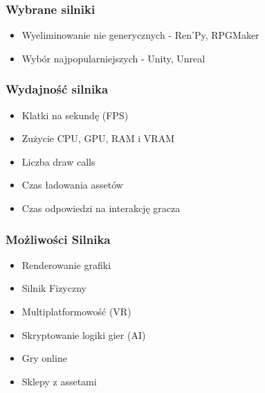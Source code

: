 \documentclass{beamer}
\begin{document}
\begin{frame}
  \frametitle{Wybrane silniki}
  \begin{itemize}
    \item Wyeliminowanie nie generycznych - Ren'Py, RPGMaker
    \item Wybór najpopularniejszych - Unity, Unreal 
  \end{itemize}
\end{frame}

\begin{frame} 
  \frametitle{Wydajność silnika}
  \begin{itemize}
    \item Klatki na sekundę (FPS)
    \item Zużycie CPU, GPU, RAM i VRAM
    \item Liczba draw calls 
    \item Czas ładowania assetów 
    \item Czas odpowiedzi na interakcję gracza
  \end{itemize} 
\end{frame}
\begin{frame}
    \frametitle{Możliwości Silnika}
    \begin{itemize}
        \item Renderowanie grafiki 
        \item Silnik Fizyczny 
        \item Multiplatformowość (VR)
        \item Skryptowanie logiki gier (AI)
        \item Gry online
        \item Sklepy z assetami
    \end{itemize}
  \end{frame}
\end{document}
